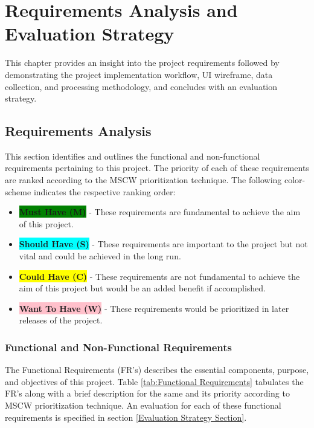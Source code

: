 
\chapter{Requirements Analysis and Evaluation Strategy} %
\label{Requirements Analysis} %


This chapter provides an insight into the project requirements followed by demonstrating the project implementation workflow, UI wireframe, data collection, and processing methodology, and concludes with an evaluation strategy.

\section{Requirements Analysis}
This section identifies and outlines the functional and non-functional requirements pertaining to this project. The priority 
of each of these requirements are ranked according to the MSCW prioritization technique. The following color-scheme 
indicates the respective ranking order:

\begin{itemize}
  \item \colorbox{green}{\textbf{Must Have (M)}} - These requirements are fundamental to achieve the aim of this project.
  \item \colorbox{cyan}{\textbf{Should Have (S)}} - These requirements are important to the project but not vital and could be achieved in the long run.
  \item \colorbox{yellow}{\textbf{Could Have (C)}} - These requirements are not fundamental to achieve the aim of this project but would be an added benefit if accomplished.
  \item \colorbox{pink}{\textbf{Want To Have (W)}} - These requirements would be prioritized in later releases of the project.
\end{itemize}

\subsection{Functional and Non-Functional Requirements}
The Functional Requirements (FR's) describes the essential components, purpose, and objectives of this project.
Table \ref{tab:Functional Requirements} tabulates the FR's along with a brief description for the same and its priority according to MSCW prioritization technique. An evaluation 
for each of these functional requirements is specified in section \ref{Evaluation Strategy Section}.

